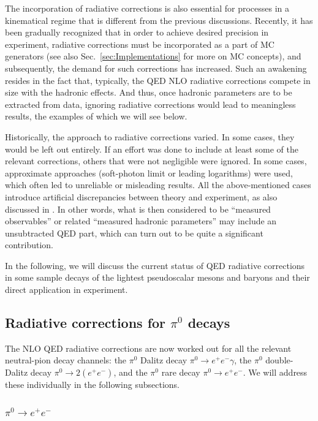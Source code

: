 The incorporation of radiative corrections is also essential for processes in a kinematical regime that is different from the previous discussions.
Recently, it has been gradually recognized that in order to achieve desired precision in experiment, radiative corrections must be incorporated as a part of MC generators (see also Sec.~\ref{sec:Implementations} for more on MC concepts), and subsequently, the demand for such corrections has increased.
Such an awakening resides in the fact that, typically, the QED NLO radiative corrections compete in size with the hadronic effects.
And thus, once hadronic parameters are to be extracted from data, ignoring radiative corrections would lead to meaningless results, the examples of which we will see below.

Historically, the approach to radiative corrections varied.
In some cases, they would be left out entirely.
If an effort was done to include at least some of the relevant corrections, others that were not negligible were ignored.
In some cases, approximate approaches (soft-photon limit or leading logarithms) were used, which often led to unreliable or misleading results.
All the above-mentioned cases introduce artificial discrepancies between theory and experiment, as also discussed in .
In other words, what is then considered to be ``measured observables'' or related ``measured hadronic parameters'' may include an unsubtracted QED part, which can turn out to be quite a significant contribution.

In the following, we will discuss the current status of QED radiative corrections in some sample decays of the lightest pseudoscalar mesons and baryons and their direct application in experiment.


\subsection{Radiative corrections for \texorpdfstring{$\pi^0$}{pi0} decays}

The NLO QED radiative corrections are now worked out for all the relevant neutral-pion decay channels: the $\pi^0$ Dalitz decay $\pi^0\to e^+e^-\gamma$, the $\pi^0$ double-Dalitz decay $\pi^0\to 2(e^+e^-)$, and the $\pi^0$ rare decay $\pi^0\to e^+e^-$.
We will address these individually in the following subsections.


\subsubsection{\texorpdfstring{$\pi^0\to e^+e^-$}{pi0->ee}}

